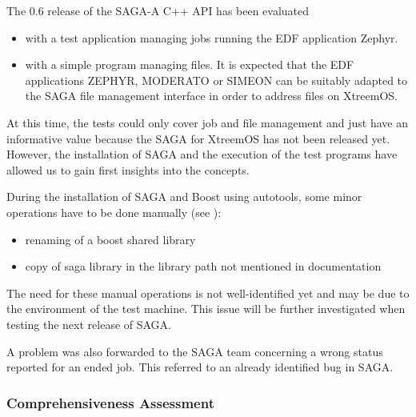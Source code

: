 The 0.6  release of the SAGA-A C++ API
has been evaluated 
\begin{itemize}
 \item with a test application 
     managing jobs running the  EDF application Zephyr.
 \item with a simple program managing 
files. It is expected that the EDF applications ZEPHYR, MODERATO or SIMEON can be suitably adapted to the SAGA file management interface in order to address files on
XtreemOS.
\end{itemize}




At this time, the tests could only cover job and file management and just
have an informative value because the SAGA for XtreemOS has not been released 
yet. However, the installation of SAGA and the execution of the test programs
have allowed us to gain first insights into the concepts.

During the installation of SAGA and Boost using autotools, some
minor operations have to be done manually (see ):
\begin{itemize}
 \item renaming of a boost shared library
 \item copy of saga library in the
       library path not mentioned in documentation
\end{itemize} 

The need for these manual operations is not well-identified
yet and may be due to the environment of the test machine.
This issue will be further investigated when testing the next
release of SAGA.


A problem was also forwarded to the SAGA team concerning a wrong status
reported for an ended job. This referred to an already identified
bug in SAGA.


\subsubsection{Comprehensiveness Assessment}

